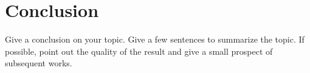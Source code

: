 \section{Conclusion}
\label{sec:conclusion}
Give a conclusion on your topic. Give a few sentences to summarize 
the topic. If possible, point out the quality of the result and give
a small prospect of subsequent works.
